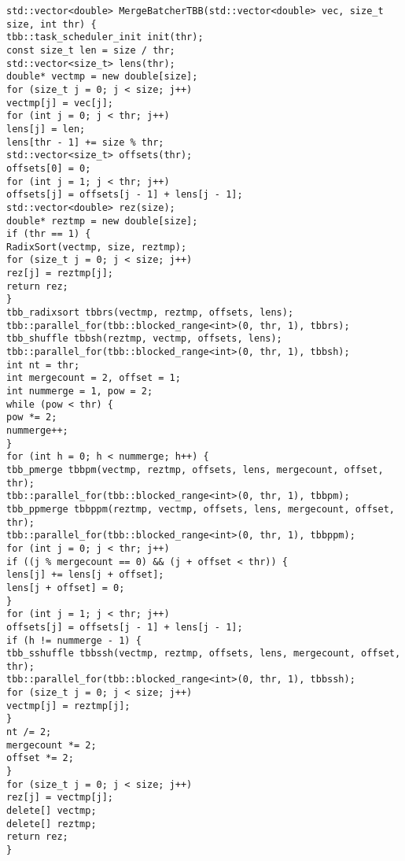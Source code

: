 \documentclass{report}
\begin{document}
\begin{lstlisting}
std::vector<double> MergeBatcherTBB(std::vector<double> vec, size_t size, int thr) {
tbb::task_scheduler_init init(thr);
const size_t len = size / thr;
std::vector<size_t> lens(thr);
double* vectmp = new double[size];
for (size_t j = 0; j < size; j++)
vectmp[j] = vec[j];
for (int j = 0; j < thr; j++)
lens[j] = len;
lens[thr - 1] += size % thr;
std::vector<size_t> offsets(thr);
offsets[0] = 0;
for (int j = 1; j < thr; j++)
offsets[j] = offsets[j - 1] + lens[j - 1];
std::vector<double> rez(size);
double* reztmp = new double[size];
if (thr == 1) {
RadixSort(vectmp, size, reztmp);
for (size_t j = 0; j < size; j++)
rez[j] = reztmp[j];
return rez;
}
tbb_radixsort tbbrs(vectmp, reztmp, offsets, lens);
tbb::parallel_for(tbb::blocked_range<int>(0, thr, 1), tbbrs);
tbb_shuffle tbbsh(reztmp, vectmp, offsets, lens);
tbb::parallel_for(tbb::blocked_range<int>(0, thr, 1), tbbsh);
int nt = thr;
int mergecount = 2, offset = 1;
int nummerge = 1, pow = 2;
while (pow < thr) {
pow *= 2;
nummerge++;
}
for (int h = 0; h < nummerge; h++) {
tbb_pmerge tbbpm(vectmp, reztmp, offsets, lens, mergecount, offset, thr);
tbb::parallel_for(tbb::blocked_range<int>(0, thr, 1), tbbpm);
tbb_ppmerge tbbppm(reztmp, vectmp, offsets, lens, mergecount, offset, thr);
tbb::parallel_for(tbb::blocked_range<int>(0, thr, 1), tbbppm);
for (int j = 0; j < thr; j++)
if ((j % mergecount == 0) && (j + offset < thr)) {
lens[j] += lens[j + offset];
lens[j + offset] = 0;
}
for (int j = 1; j < thr; j++)
offsets[j] = offsets[j - 1] + lens[j - 1];
if (h != nummerge - 1) {
tbb_sshuffle tbbssh(vectmp, reztmp, offsets, lens, mergecount, offset, thr);
tbb::parallel_for(tbb::blocked_range<int>(0, thr, 1), tbbssh);
for (size_t j = 0; j < size; j++)
vectmp[j] = reztmp[j];
}
nt /= 2;
mergecount *= 2;
offset *= 2;
}
for (size_t j = 0; j < size; j++)
rez[j] = vectmp[j];
delete[] vectmp;
delete[] reztmp;
return rez;
}


\end{lstlisting}
\end{document}

